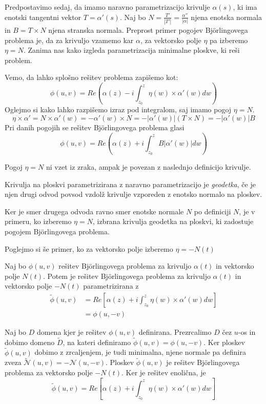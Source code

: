 \documentclass[mat1]{fmfdelo}
\begin{document}
Predpostavimo sedaj, da imamo naravno parametrizacijo krivulje $\alpha(s)$, ki ima enotski tangentni vektor $T = \alpha'(s)$.
Naj bo $N = \frac{T'}{| T' |} = \frac{\alpha''}{| \alpha |}$ njena enotska normala in $B = T \times N$ njena stranska normala.
Preprost primer pogojev Björlingovega problema je, da za krivuljo vzamemo kar $\alpha$, za vektorsko polje $\eta$ pa izberemo $\eta = N$.
Zanima nas kako izgleda parametrizacija minimalne ploskve, ki reši problem.

Vemo, da lahko splošno rešitev problema zapišemo kot:
$$ \phi (u, v) = Re \left( \alpha (z) - i \int_{z_0}^{z} \eta (w) \times \alpha' (w) dw \right) $$
Oglejmo si kako lahko razpišemo izraz pod integralom, saj imamo pogoj $\eta = N$.
$$ \eta \times \alpha' = N \times \alpha' (w) = - \alpha' (w) \times N = - | \alpha' (w) | (T \times N) = - | \alpha' (w) | B $$ 
Pri danih pogojih se rešitev Björlingovega problema glasi
$$ \phi (u, v) = Re \left( \alpha (z) + i \int_{z_0}^{z} B | \alpha' (w) | dw \right) $$

Pogoj $\eta = N$ ni vzet iz zraka, ampak je povezan z naslednjo definicijo krivulje.

\begin{definicija}
    Krivulja na ploskvi parametrizirana z naravno parametrizacijo je \emph{geodetka}, če je njen drugi odvod 
    povsod vzdolž krivulje vzporeden z enotsko normalo na ploskev. 
\end{definicija}

Ker je smer drugega odvoda ravno smer enotske normale $N$ po definiciji $N$, je v primeru, ko izberemo $\eta = N$,
izbrana krivulja geodetka na ploskvi, ki zadostuje pogojem Björlingovega problema.

Poglejmo si še primer, ko za vektorsko polje izberemo $\eta = - N(t)$

\begin{posledica}
    Naj bo $\phi (u, v)$ rešitev Björlingovega problema za krivuljo $\alpha (t)$ in vektorsko polje $N (t)$.
    Potem je rešitev Björlingovega problema za krivuljo $\alpha (t)$ in vektorsko polje $- N (t)$ parametrizirana z
    \begin{align*}
        \tilde{\phi} (u, v) &= Re \left[ \alpha(z) + i \int_{z_0}^{z} \eta (w) \times \alpha' (w) dw \right] \\
        &= \phi (u, - v)
    \end{align*}
\end{posledica}

\begin{dokaz}
    Naj bo $D$ domena kjer je rešitev $\phi (u, v)$ definirana. Prezrcalimo $D$ čez $u$-os in dobimo domeno $\tilde{D}$,
    na kateri definiramo $\tilde{\phi} (u, v) = \phi (u, - v)$.
    Ker ploskev $\tilde{\phi} (u, v)$ dobimo z zrcaljenjem, je tudi minimalna, njene normale pa definira zveza 
    $\tilde{\mathcal{N}} (u, v) = - \mathcal{N} (u, -v)$. Ploskev $\tilde{\phi} (u, v)$ je rešitev Björlingovega problema
    za vektorsko polje $- N(t)$.
    Ker je rešitev enolična, je 
    $$ \tilde{\phi} (u, v) = Re \left[ \alpha(z) + i \int_{z_0}^{z} \eta (w) \times \alpha' (w) dw \right] $$
\end{dokaz}
\end{document}
